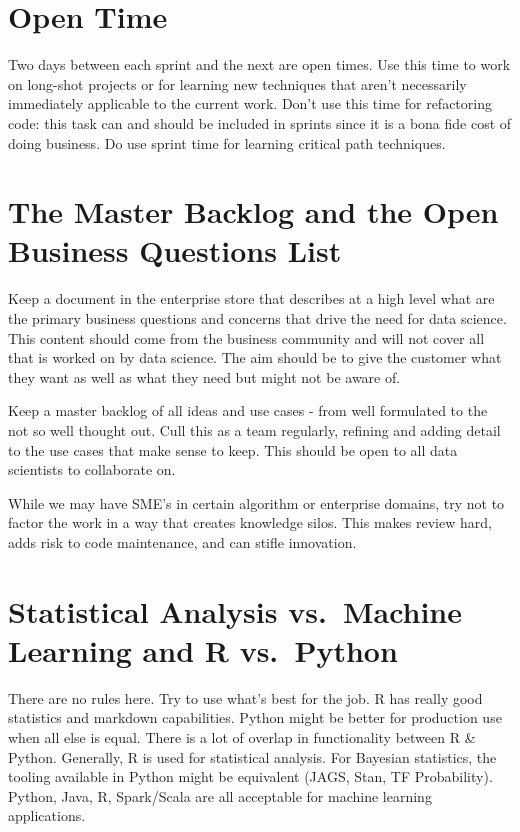 \documentclass[
  11pt,
]{book}
\begin{document}
\hypertarget{open-time}{%
\section{Open Time}\label{open-time}}

Two days between each sprint and the next are open times. Use this time to work on long-shot projects or for learning new techniques that aren't necessarily immediately applicable to the current work. Don't use this time for refactoring code: this task can and should be included in sprints since it is a bona fide cost of doing business. Do use sprint time for learning critical path techniques.

\hypertarget{the-master-backlog-and-the-open-business-questions-list}{%
\section{The Master Backlog and the Open Business Questions List}\label{the-master-backlog-and-the-open-business-questions-list}}

Keep a document in the enterprise store that describes at a high level what are the primary business questions and concerns that drive the need for data science. This content should come from the business community and will not cover all that is worked on by data science. The aim should be to give the customer what they want as well as what they need but might not be aware of.

Keep a master backlog of all ideas and use cases - from well formulated to the not so well thought out. Cull this as a team regularly, refining and adding detail to the use cases that make sense to keep. This should be open to all data scientists to collaborate on.

While we may have SME's in certain algorithm or enterprise domains, try not to factor the work in a way that creates knowledge silos. This makes review hard, adds risk to code maintenance, and can stifle innovation.

\hypertarget{statistical-analysis-vs.-machine-learning-and-r-vs.-python}{%
\section{Statistical Analysis vs.~Machine Learning and R vs.~Python}\label{statistical-analysis-vs.-machine-learning-and-r-vs.-python}}

There are no rules here. Try to use what's best for the job. R has really good statistics and markdown capabilities. Python might be better for production use when all else is equal. There is a lot of overlap in functionality between R \& Python. Generally, R is used for statistical analysis. For Bayesian statistics, the tooling available in Python might be equivalent (JAGS, Stan, TF Probability). Python, Java, R, Spark/Scala are all acceptable for machine learning applications.
\end{document}
